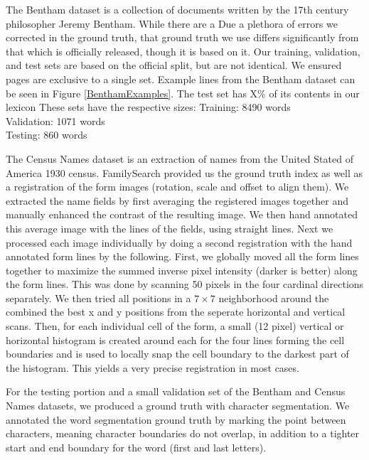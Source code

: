 \documentclass[ms,electronic,twosidetoc,letterpaper,chaptercenter,parttop,lol,lof,lot]{byumsphd}
\begin{document}
The Bentham dataset \cite{bentham} is a collection of documents written by the 17th century philosopher Jeremy Bentham. While there are a  Due a plethora of errors we corrected in the ground truth, that ground truth we use differs significantly from that which is officially released, though it is based on it. Our training, validation, and test sets are based on the official split, but are not identical. We ensured pages are exclusive to a single set.
Example lines from the Bentham dataset can be seen in Figure \ref{BenthamExamples}.
The test set has X\% of its contents in our lexicon
These sets have the respective sizes:
\indent \indent Training: 8490 words\\
\indent \indent Validation: 1071 words\\
\indent \indent Testing: 860 words

The Census Names dataset is an extraction of names from the United Stated of America 1930 census. FamilySearch provided us the ground truth index as well as a  registration of the form images (rotation, scale and offset to align them). We extracted the name fields by first averaging the registered images together and manually enhanced the contrast of the resulting image. We then hand annotated this average image with the lines of the fields, using straight lines. Next we processed each image individually by doing a second registration with the hand annotated form lines by the following. First, we globally moved all the form lines together to maximize the summed inverse pixel intensity (darker is better) along the form lines. This was done by scanning 50 pixels in the four cardinal directions separately. We then tried all positions in a $7\times 7$ neighborhood around the combined the best x and y positions from the seperate horizontal and vertical scans.  Then, for each individual cell of the form, a small (12 pixel) vertical or horizontal histogram is created around each for the four lines forming the cell boundaries and is used to locally snap the cell boundary to the darkest part of the histogram. This yields a very precise registration in most cases.

For the testing portion and a small validation set of the Bentham and Census Names datasets, we produced a ground truth with character segmentation. We annotated the word segmentation ground truth by marking the point between characters, meaning character boundaries do not overlap, in addition to a tighter start and end boundary for the word (first and last letters).
\end{document}
